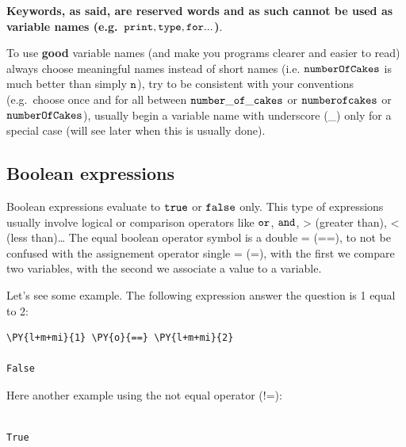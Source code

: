\textbf{Keywords, as said, are reserved words and as such cannot be used as variable names (e.g.~\(\tt{print, type, for...}\))}.

To use \textbf{good} variable names (and make you programs clearer and easier to read) always choose meaningful names instead of short names (i.e. \(\tt{numberOfCakes}\) is much better than simply \(\tt{n}\)), try to be consistent with your conventions (e.g.~choose once and for all between \(\tt{number\_of\_cakes}\) or
\(\tt{numberofcakes}\) or \(\tt{numberOfCakes}\)), usually begin a variable name with underscore (\_) only for a special case (will see later when this is usually done).

\subsection{Boolean expressions}\label{boolean-expressions}

Boolean expressions evaluate to \(\tt{true}\) or \(\tt{false}\) only. This type
of expressions usually involve logical or comparison operators like \(\tt{or}\), \(\tt{and}\), \textgreater{} (greater than), \textless{} (less than)\ldots{}
The equal boolean operator symbol is a double = (==), to not be confused with the assignement operator single = (=), with the first we compare two variables, with the second we associate a value to a variable.

Let's see some example. The following expression answer the question is 1 equal to 2:

\begin{tcolorbox}[breakable, size=fbox, boxrule=1pt, pad at break*=1mm, colback=cellbackground, colframe=cellborder]
\begin{Verbatim}[commandchars=\\\{\}]
\PY{l+m+mi}{1} \PY{o}{==} \PY{l+m+mi}{2} 

False
\end{Verbatim}
\end{tcolorbox}

Here another example using the not equal operator (!=):

\begin{tcolorbox}[breakable, size=fbox, boxrule=1pt, pad at break*=1mm, colback=cellbackground, colframe=cellborder]
\begin{Verbatim}[commandchars=\\\{\}]

True
\end{Verbatim}
\end{tcolorbox}

